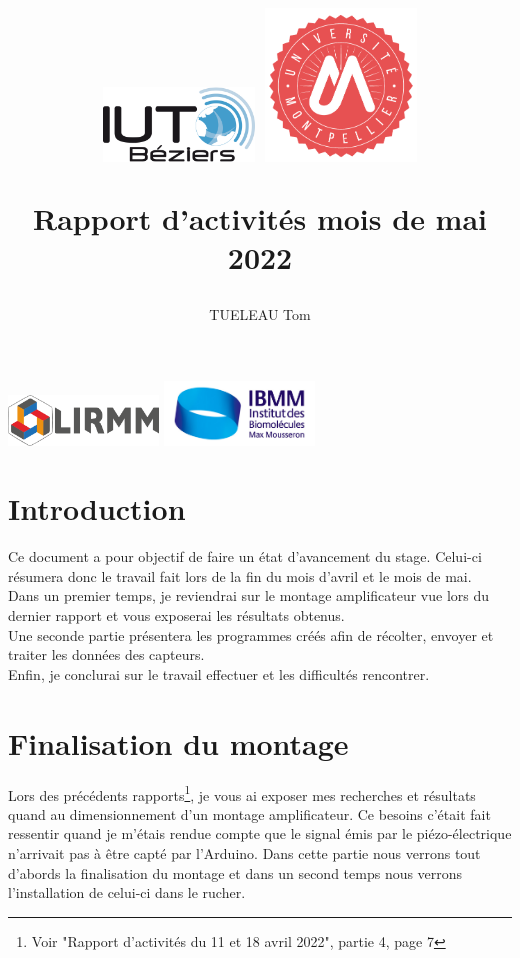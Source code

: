 \documentclass[11pt,french,a4paper]{article}
\title{
 \centering
         \includegraphics[width=4cm]{../../../logo/IUTlogo.png}  \hspace{7cm}
         \includegraphics[width=4cm]{../../../logo/UMlogo.png}  \hspace{7cm}
    
	\LARGE{Rapport d'activités mois de mai 2022 }
	\author{TUELEAU Tom}
}
\author{
	\date{}
}
\begin{document}
\maketitle
	 \includegraphics[width=4cm]{../../../logo/LIRMMlogo.png}  \hspace{7cm}
         \includegraphics[width=4cm]{../../../logo/IBMMlogo.jpg}  \hspace{7cm}
\newpage
\tableofcontents
\newpage
\section{Introduction}
Ce document a pour objectif de faire un état d'avancement du stage. Celui-ci résumera donc le travail fait lors de la fin du mois d'avril et le mois de mai.
\\Dans un premier temps, je reviendrai sur le montage amplificateur vue lors du dernier rapport et vous exposerai les résultats obtenus.
\\Une seconde partie présentera les programmes créés afin de récolter, envoyer et traiter les données des capteurs. 
\\Enfin, je conclurai sur le travail effectuer et les difficultés rencontrer. 

\section{Finalisation du montage}
Lors des précédents rapports\footnote{Voir "Rapport d’activités du 11 et 18 avril 2022", partie 4, page 7}, je vous ai exposer mes recherches et résultats quand au dimensionnement d'un montage amplificateur. Ce besoins c'était fait ressentir quand je m'étais rendue compte que le signal émis par le piézo-électrique n'arrivait pas à être capté par l'Arduino.  Dans cette partie nous verrons tout d'abords la finalisation du montage et dans un second temps nous verrons l'installation de celui-ci dans le rucher.\\
\end{document}
